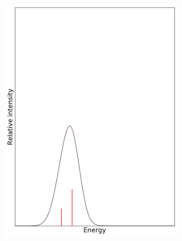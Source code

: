 \documentclass[12pt, fleqn]{beamer}
\begin{document}
\begin{frame}
\begin{overlayarea}{\textwidth}{14cm}
{\begin{figure}[h!]
\begin{subfigure}[b]{0.45\linewidth}
                    \includegraphics[width=\linewidth]{fc_sp/sp_1.png}
                \end{subfigure}
            \end{figure}
        }
\end{overlayarea}
\end{frame}
\end{document}
